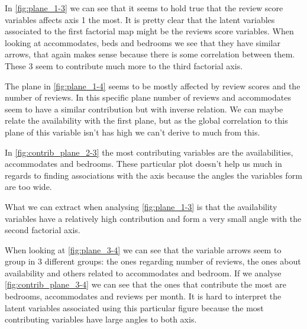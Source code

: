 

In \cref{fig:plane_1-3} we can see that it seems to hold true that 
the review score variables affects axis 1 the most. It is pretty clear that the latent variables associated to the 
first factorial map might be the reviews score variables. When looking at accommodates, beds and 
bedrooms we see that they have similar arrows, that again makes sense because there is some 
correlation between them. These 3 seem to contribute much more to the third factorial axis.


The plane in \cref{fig:plane_1-4} seems to be mostly affected by review scores and the number of reviews.
In this specific plane number of reviews and accommodates seem to have a similar contribution but with
inverse relation. We can maybe relate the availability with the first plane, but as the global correlation
to this plane of this variable isn't has high we can't derive to much from this.




In \cref{fig:contrib_plane_2-3} the most contributing variables are the availabilities, accommodates and bedrooms.
These particular plot doesn't help us much in regards to finding associations with the axis because the
angles the variables form are too wide.


What we can extract when analysing \cref{fig:plane_1-3} is that the availability variables have 
a relatively high contribution and form a very small angle with the second factorial axis.


When looking at \cref{fig:plane_3-4} we can see that the variable arrows seem to group in 3 different groups: the ones regarding number of reviews, the ones about availability and others related to accommodates and bedroom. If we analyse \cref{fig:contrib_plane_3-4} we can see that the ones that contribute the most are bedrooms, accommodates 
and reviews per month. It is hard to interpret the latent variables associated using this particular figure because the most contributing variables have large angles to both axis.


